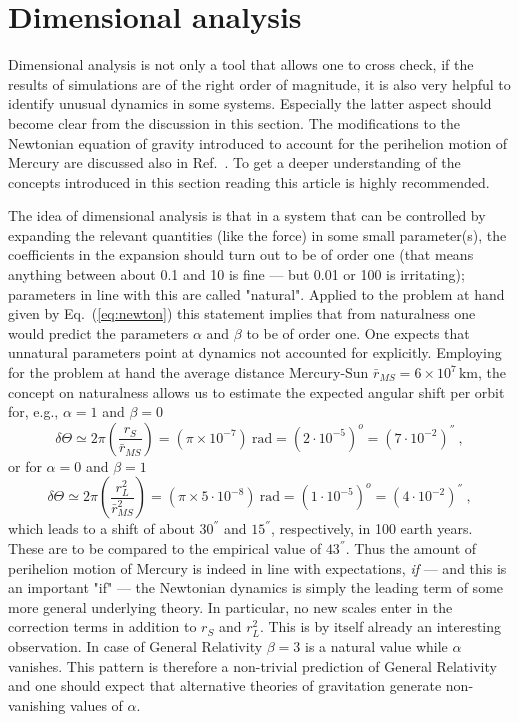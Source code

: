 \documentclass[12pt,ngerman,american]{iopart}
\begin{document}
\section{Dimensional analysis}\label{sec:analysis}

Dimensional analysis is not only a tool that allows one to cross check, if the results of simulations are of the right order of magnitude, it is also very helpful to identify unusual dynamics in some systems.
Especially the latter aspect should become clear from the discussion in this section. The modifications to the Newtonian equation of gravity introduced to account for the perihelion motion of Mercury
are discussed also in Ref.~\cite{Wells:2011st}. To get a deeper understanding of the concepts introduced in this section reading this article is highly recommended.

The idea of dimensional analysis is that in a system that can be controlled by expanding the relevant quantities (like the force) in some small parameter(s), the coefficients in the expansion should turn out to be of order one (that means anything between about 0.1 and 10 is fine --- but 0.01 or 100 is irritating); parameters in line with this are called "natural".
Applied to the problem at hand given by Eq.~(\ref{eq:newton}) this statement implies that from naturalness one would predict the parameters $\alpha$ and $\beta$ to be
of order one.
One expects that unnatural parameters point at dynamics not accounted for explicitly.
Employing for the problem at hand the average distance Mercury-Sun $\bar r_{MS}=6\times 10^7\,\mathrm{km}$, the concept on
naturalness allows us to estimate the expected angular shift per orbit for, e.g., $\alpha=1$ and $\beta=0$
\begin{equation}
\delta \Theta \simeq 2\pi\left(\frac{r_S}{\bar r_{MS}}\right) = (\pi \times 10^{-7}) \ \mbox{rad} = (2\cdot 10^{-5})^o = (7\cdot 10^{-2}) ^{''} \ ,
\end{equation}
or for $\alpha=0$ and $\beta=1$
\begin{equation}
\delta \Theta \simeq 2\pi\left(\frac{r_L^2}{\bar r^2_{MS}}\right) = (\pi \times 5 \cdot 10^{-8}) \ \mbox{rad} = (1 \cdot 10^{-5})^o = (4\cdot 10^{-2}) ^{''} \ ,
\end{equation}
which leads to a shift of about $30^{''}$ and $15^{''}$, respectively, in 100 earth years. These are to be compared to the empirical value of $43^{''}$.
Thus the amount of perihelion motion of Mercury is indeed in line with expectations, \textit{if} --- and this is an important "if" --- the
Newtonian dynamics is simply the leading term of some more general underlying theory.
 In particular, no new scales enter in the correction terms in addition to $r_S$ and $r_L^2$. This is by itself already an
 interesting observation.
 In case of General Relativity $\beta=3$ is a natural value
while $\alpha$ vanishes. This pattern is therefore a non-trivial prediction of General Relativity and one should expect
that alternative theories of gravitation generate non-vanishing values of $\alpha$.
\end{document}
